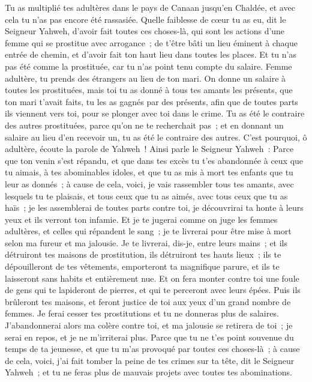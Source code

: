 \begin{multicols}{2}
Tu as multiplié tes adultères dans le pays de Canaan jusqu'en Chaldée, et avec cela tu n'as pas encore été rassasiée.
Quelle faiblesse de cœur tu as eu, dit le Seigneur Yahweh, d'avoir fait toutes ces choses-là, qui sont les actions d'une femme qui se prostitue avec arrogance~;
de t'être bâti un lieu éminent à chaque entrée de chemin, et d'avoir fait ton haut lieu dans toutes les places. Et tu n'as pas été comme la prostituée, car tu n'as point tenu compte du salaire.
Femme adultère, tu prends des étrangers au lieu de ton mari.
On donne un salaire à toutes les prostituées, mais toi tu as donné à tous tes amants les présents, que ton mari t'avait faits, tu les as gagnés par des présents, afin que de toutes parts ils viennent vers toi, pour se plonger avec toi dans le crime.
Tu as été le contraire des autres prostituées, parce qu'on ne te recherchait pas~; et en donnant un salaire au lieu d'en recevoir un, tu as été le contraire des autres.
C'est pourquoi, ô adultère, écoute la parole de Yahweh~!
Ainsi parle le Seigneur Yahweh~: Parce que ton venin s'est répandu, et que dans tes excès tu t'es abandonnée à ceux que tu aimais, à tes abominables idoles, et que tu as mis à mort tes enfants que tu leur as donnés~;
à cause de cela, voici, je vais rassembler tous tes amants, avec lesquels tu te plaisais, et tous ceux que tu as aimés, avec tous ceux que tu as haïs~; je les assemblerai de toutes parts contre toi, je découvrirai ta honte à leurs yeux et ils verront ton infamie.
Et je te jugerai comme on juge les femmes adultères, et celles qui répandent le sang~; je te livrerai pour être mise à mort selon ma fureur et ma jalousie.
Je te livrerai, dis-je, entre leurs mains~; et ils détruiront tes maisons de prostitution, ils détruiront tes hauts lieux~; ils te dépouilleront de tes vêtements, emporteront ta magnifique parure, et ils te laisseront sans habits et entièrement nue.
Et on fera monter contre toi une foule de gens qui te lapideront de pierres, et qui te perceront avec leurs épées.
Puis ils brûleront tes maisons, et feront justice de toi aux yeux d'un grand nombre de femmes. Je ferai cesser tes prostitutions et tu ne donneras plus de salaires.
J'abandonnerai alors ma colère contre toi, et ma jalousie se retirera de toi~; je serai en repos, et je ne m'irriterai plus.
Parce que tu ne t'es point souvenue du temps de ta jeunesse, et que tu m'as provoqué par toutes ces choses-là~; à cause de cela, voici, j'ai fait tomber la peine de tes crimes sur ta tête, dit le Seigneur Yahweh~; et tu ne feras plus de mauvais projets avec toutes tes abominations.

\end{multicols}

